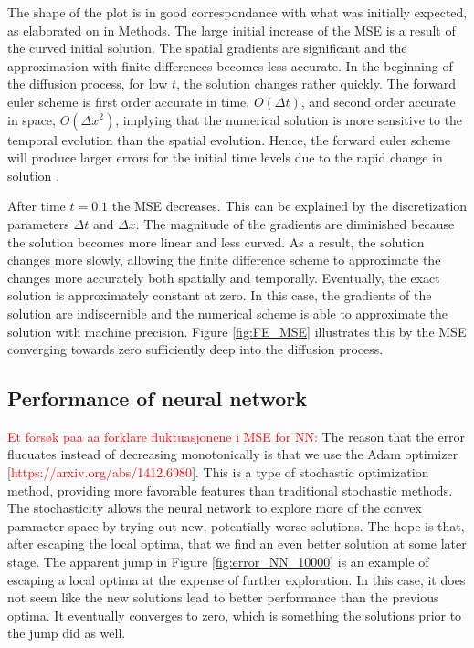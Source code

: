 \documentclass[12pt]{extarticle}
\begin{document}
\par The shape of the plot is in good correspondance with what was initially expected, as elaborated on in Methods. The large initial increase of the MSE is a result of the curved initial solution. The spatial gradients are significant and the approximation with finite differences becomes less accurate.
In the beginning of the diffusion process, for low $t$, the solution changes rather quickly. The forward euler scheme is first order accurate in time, $O(\Delta t)$, and second order accurate in space, $O(\Delta x^2)$, implying that the numerical solution is more sensitive to the temporal evolution than the spatial evolution. Hence, the forward euler scheme will produce larger errors for the initial time levels due to the rapid change in solution \cite{Linge2017}.
\par After time $t=0.1$ the MSE decreases. This can be explained by the discretization parameters $\Delta t$ and $\Delta x$. The magnitude of the gradients are diminished because the solution becomes more linear and less curved. As a result, the solution changes more slowly, allowing the finite difference scheme to approximate the changes more accurately both spatially and temporally. Eventually, the exact solution is approximately constant at zero. In this case, the gradients of the solution are indiscernible and the numerical scheme is able to approximate the solution with machine precision. Figure \ref{fig:FE_MSE} illustrates this by the MSE converging towards zero sufficiently deep into the diffusion process.

\subsection*{Performance of neural network}

\par \textcolor{red}{Et forsøk paa aa forklare fluktuasjonene i MSE for NN:} The reason that the error flucuates instead of decreasing monotonically is that we use the Adam optimizer [\textcolor{red}{https://arxiv.org/abs/1412.6980}]. This is a type of stochastic optimization method, providing more favorable features than traditional stochastic methods. The stochasticity allows the neural network to explore more of the convex parameter space by trying out new, potentially worse solutions. The hope is that, after escaping the local optima, that we find an even better solution at some later stage. The apparent jump in Figure \ref{fig:error_NN_10000} is an example of escaping a local optima at the expense of further exploration. In this case, it does not seem like the new solutions lead to better performance than the previous optima. It eventually converges to zero, which is something the solutions prior to the jump did as well. 
\end{document}
